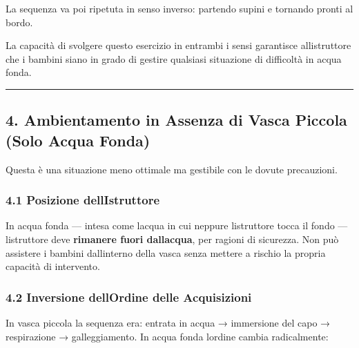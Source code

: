 \documentclass[a4paper,11pt]{article}
\begin{document}
La sequenza va poi ripetuta in senso inverso: partendo supini e tornando
pronti al bordo.

La capacità di svolgere questo esercizio in entrambi i sensi garantisce
all\textquotesingle istruttore che i bambini siano in grado di gestire
qualsiasi situazione di difficoltà in acqua fonda.

\begin{center}\rule{0.5\linewidth}{0.5pt}\end{center}

\subsection{4. Ambientamento in Assenza di Vasca Piccola (Solo Acqua
      Fonda)}\label{ambientamento-in-assenza-di-vasca-piccola-solo-acqua-fonda}

Questa è una situazione meno ottimale ma gestibile con le dovute
precauzioni.

\subsubsection{4.1 Posizione
      dell\textquotesingle Istruttore}\label{posizione-dellistruttore}

In acqua fonda --- intesa come l\textquotesingle acqua in cui neppure
l\textquotesingle istruttore tocca il fondo ---
l\textquotesingle istruttore deve \textbf{rimanere fuori
      dall\textquotesingle acqua}, per ragioni di sicurezza. Non può assistere
i bambini dall\textquotesingle interno della vasca senza mettere a
rischio la propria capacità di intervento.

\subsubsection{4.2 Inversione dell\textquotesingle Ordine delle
      Acquisizioni}\label{inversione-dellordine-delle-acquisizioni}

In vasca piccola la sequenza era: entrata in acqua → immersione del capo
→ respirazione → galleggiamento. In acqua fonda l\textquotesingle ordine
cambia radicalmente:
\end{document}
